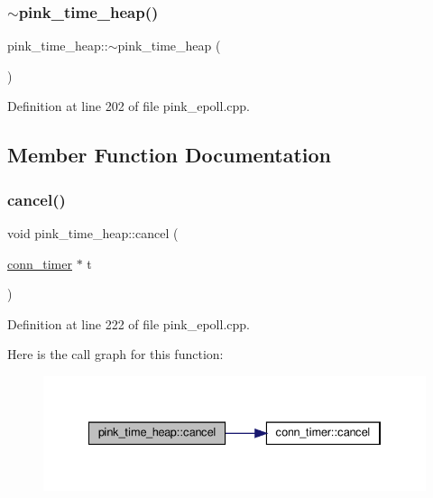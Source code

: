 \subsubsection{\texorpdfstring{$\sim$pink\+\_\+time\+\_\+heap()}{~pink\_time\_heap()}}
{\footnotesize\ttfamily pink\+\_\+time\+\_\+heap\+::$\sim$pink\+\_\+time\+\_\+heap (\begin{DoxyParamCaption}{ }\end{DoxyParamCaption})}



Definition at line 202 of file pink\+\_\+epoll.\+cpp.



\subsection{Member Function Documentation}
\mbox{\label{classpink__time__heap_a331d1f993efc7bd50f8e6d10e5f1c6ee}} 
\subsubsection{\texorpdfstring{cancel()}{cancel()}}
{\footnotesize\ttfamily void pink\+\_\+time\+\_\+heap\+::cancel (\begin{DoxyParamCaption}\item[{\hyperlink{classconn__timer}{conn\+\_\+timer} $\ast$}]{t }\end{DoxyParamCaption})}



Definition at line 222 of file pink\+\_\+epoll.\+cpp.

Here is the call graph for this function\+:\nopagebreak
\begin{figure}[H]
\begin{center}
\leavevmode
\includegraphics[width=334pt]{classpink__time__heap_a331d1f993efc7bd50f8e6d10e5f1c6ee_cgraph}
\end{center}
\end{figure}
\mbox{\label{classpink__time__heap_ade64cf32193747380cb57c5709e28383}} 
